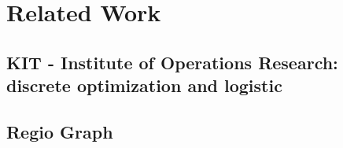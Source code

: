 \section{Related Work}

\subsection{KIT - Institute of Operations Research: discrete optimization and logistic}

\subsection{Regio Graph}
